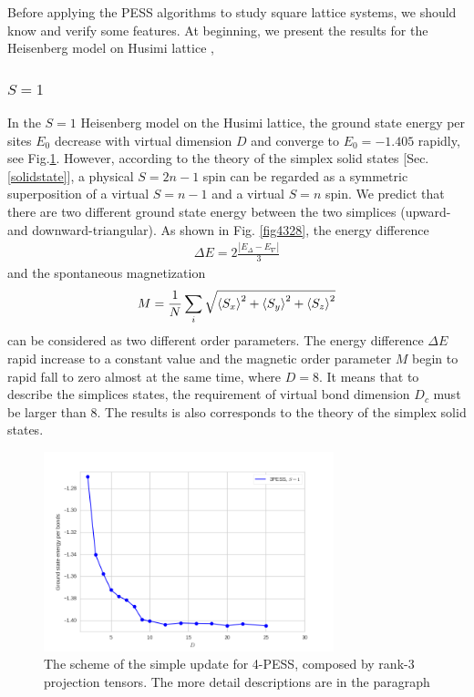Before applying the PESS algorithms to study square lattice systems, we should know and verify some features. At beginning, we present the results for the Heisenberg model on Husimi lattice \cite{},

\subsubsection{$S=1$}

In the $S=1$ Heisenberg model on the Husimi lattice, the ground state energy per sites $E_0$ decrease with virtual dimension $D$ and converge to $E_0=-1.405$ rapidly, see Fig.\ref{fig4327}. However, according to the theory of the simplex solid states [Sec. \ref{solidstate}], a physical $S=2n-1$ spin can be regarded as a symmetric superposition of a virtual $S=n-1$ and a virtual $S=n$ spin. We predict that there are two different ground state energy between the two simplices (upward- and downward-triangular). As shown in Fig. \ref{fig4328}, the energy difference
\begin{align}
	\Delta E = 2 \frac{|E_{\Delta}-E_{\nabla}|}{3}
\end{align}
and the spontaneous magnetization
\begin{align}
	M = \frac{1}{N} \sum_{i}{\sqrt{\braket{S_x}^2 + \braket{S_y}^2 + \braket{S_z}^2}}
\end{align}
can be considered as two different order parameters. The energy difference $\Delta E$ rapid increase to a constant value and the magnetic order parameter $M$ begin to rapid fall to zero almost at the same time, where $D=8$. It means that to describe the simplices states, the requirement of virtual bond dimension $D_c$ must be larger than $8$. The results is also corresponds to the theory of the simplex solid states.

\begin{figure}[H]
	\centering
	\includegraphics[width=0.75\textwidth]{figures/3pess_S1GE.png}
	\caption[The scheme of the simple update for 4-PESS, composed by rank-3 projection tensors.]{The scheme of the simple update for 4-PESS, composed by rank-3 projection tensors. The more detail descriptions are in the paragraph}
	\label{fig4327}
\end{figure}

